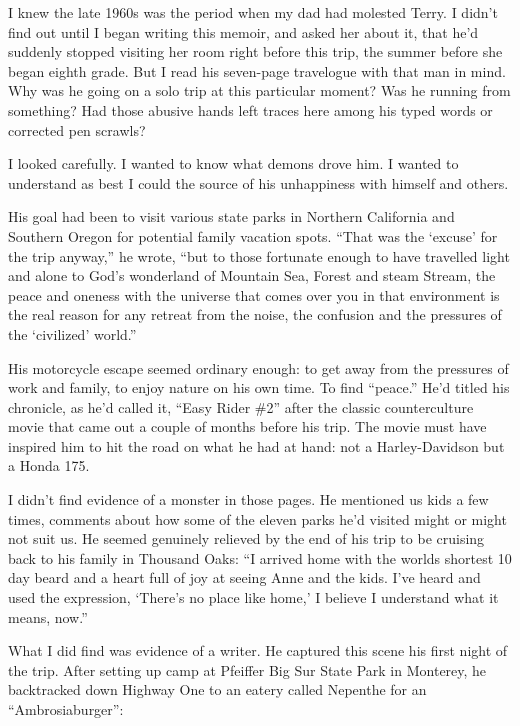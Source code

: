 \documentclass[12pt]{book}
\begin{document}
I knew the late 1960s was the period when my dad had molested Terry. I didn't find out until I began writing this memoir, and asked her about it, that he'd suddenly stopped visiting her room right before this trip, the summer before she began eighth grade. But I read his seven-page travelogue with that man in mind. Why was he going on a solo trip at this particular moment? Was he running from something? Had those abusive hands left traces here among his typed words or corrected pen scrawls?

I looked carefully. I wanted to know what demons drove him. I wanted to understand as best I could the source of his unhappiness with himself and others.

His goal had been to visit various state parks in Northern California and Southern Oregon for potential family vacation spots. ``That was the `excuse' for the trip anyway,'' he wrote, ``but to those fortunate enough to have travelled light and alone to God's wonderland of Mountain Sea, Forest and steam Stream, the peace and oneness with the universe that comes over you in that environment is the real reason for any retreat from the noise, the confusion and the pressures of the `civilized' world.''

His motorcycle escape seemed ordinary enough: to get away from the pressures of work and family, to enjoy nature on his own time. To find ``peace.'' He'd titled his chronicle, as he'd called it, ``Easy Rider \#2'' after the classic counterculture movie that came out a couple of months before his trip. The movie must have inspired him to hit the road on what he had at hand: not a Harley-Davidson but a Honda 175.

I didn't find evidence of a monster in those pages. He mentioned us kids a few times, comments about how some of the eleven parks he'd visited might or might not suit us. He seemed genuinely relieved by the end of his trip to be cruising back to his family in Thousand Oaks: ``I arrived home with the worlds shortest 10 day beard and a heart full of joy at seeing Anne and the kids. I've heard and used the expression, `There's no place like home,' I believe I understand what it means, now.''

What I did find was evidence of a writer. He captured this scene his first night of the trip. After setting up camp at Pfeiffer Big Sur State Park in Monterey, he backtracked down Highway One to an eatery called Nepenthe for an ``Ambrosiaburger'':
\end{document}
